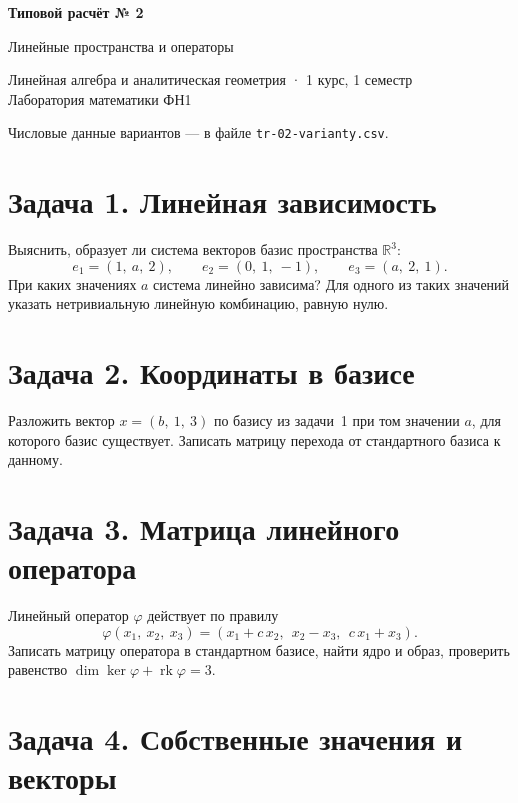 \documentclass[12pt, a4paper]{article}
\begin{document}
\begin{center}
  {\large\bfseries Типовой расчёт № 2}

  \vspace{0.3em}
  {\large Линейные пространства и операторы}

  \vspace{0.5em}
  {\small Линейная алгебра и аналитическая геометрия · 1 курс, 1 семестр\\
  Лаборатория математики ФН1}
\end{center}

\vspace{1em}

\noindent
Числовые данные вариантов — в файле \texttt{tr-02-varianty.csv}.

\section*{Задача 1. Линейная зависимость}

Выяснить, образует ли система векторов базис пространства $\mathbb{R}^3$:
\[
e_1 = (1,\ a,\ 2),\qquad e_2 = (0,\ 1,\ -1),\qquad e_3 = (a,\ 2,\ 1).
\]
При каких значениях $a$ система линейно зависима? Для одного из таких значений
указать нетривиальную линейную комбинацию, равную нулю.

\section*{Задача 2. Координаты в базисе}

Разложить вектор $x = (b,\ 1,\ 3)$ по базису из задачи~1 при том значении $a$,
для которого базис существует. Записать матрицу перехода от стандартного
базиса к данному.

\section*{Задача 3. Матрица линейного оператора}

Линейный оператор $\varphi$ действует по правилу
\[
\varphi(x_1,\ x_2,\ x_3) = (x_1 + c\,x_2,\ \ x_2 - x_3,\ \ c\,x_1 + x_3).
\]
Записать матрицу оператора в стандартном базисе, найти ядро и образ,
проверить равенство $\dim\ker\varphi + \operatorname{rk}\varphi = 3$.

\section*{Задача 4. Собственные значения и векторы}
\end{document}
